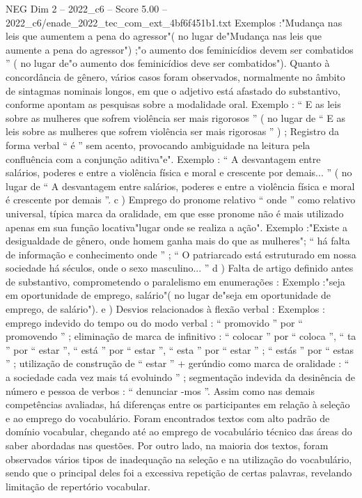 \begin{textsample}{NEG Dim 2 – 2022\_c6 – Score 5.00 – 2022\_c6/enade\_2022\_tec\_com\_ext\_4bf6f451b1.txt}
Exemplos :"Mudança nas leis que aumentem a pena do agressor"( no lugar de"Mudança nas leis que aumente a pena do agressor") ;"o aumento dos feminicídios devem ser combatidos ” ( no lugar de"o aumento dos feminicídios deve ser combatidos").
Quanto à concordância de gênero, vários casos foram observados, normalmente no âmbito de sintagmas nominais longos, em que o adjetivo está afastado do substantivo, conforme apontam as pesquisas sobre a modalidade oral.
Exemplo : “ E as leis sobre as mulheres que sofrem violência ser mais rigorosos ” ( no lugar de “ E as leis sobre as mulheres que sofrem violência ser mais rigorosas ” ) ; Registro da forma verbal “ é ” sem acento, provocando ambiguidade na leitura pela confluência com a conjunção aditiva"e".
Exemplo : “ A desvantagem entre salários, poderes e entre a violência física e moral e crescente por demais... ” ( no lugar de “ A desvantagem entre salários, poderes e entre a violência física e moral é crescente por demais ”. c ) Emprego do pronome relativo “ onde ” como relativo universal, típica marca da oralidade, em que esse pronome não é mais utilizado apenas em sua função locativa"lugar onde se realiza a ação".
Exemplo :"Existe a desigualdade de gênero, onde homem ganha mais do que as mulheres"; “ há falta de informação e conhecimento onde ” ; “ O patriarcado está estruturado em nossa sociedade há séculos, onde o sexo masculino... ” d ) Falta de artigo definido antes de substantivo, comprometendo o paralelismo em enumerações : Exemplo :"seja em oportunidade de emprego, salário"( no lugar de"seja em oportunidade de emprego, de salário"). e ) Desvios relacionados à flexão verbal : Exemplos : emprego indevido do tempo ou do modo verbal : “ promovido ” por “ promovendo ” ; eliminação de marca de infinitivo : “ colocar ” por “ coloca ”, “ ta ” por “ estar ”, “ está ” por “ estar ”, “ esta ” por “ estar ” ; “ estás ” por “ estas ” ; utilização de construção de “ estar ” + gerúndio como marca de oralidade : “ a sociedade cada vez mais tá evoluindo ” ; segmentação indevida da desinência de número e pessoa de verbos : “ denunciar -mos ”.
Assim como nas demais competências avaliadas, há diferenças entre os participantes em relação à seleção e ao emprego do vocabulário.
Foram encontrados textos com alto padrão de domínio vocabular, chegando até ao emprego de vocabulário técnico das áreas do saber abordadas nas questões.
Por outro lado, na maioria dos textos, foram observados vários tipos de inadequação na seleção e na utilização do vocabulário, sendo que o principal deles foi a excessiva repetição de certas palavras, revelando limitação de repertório vocabular.

\end{textsample}
